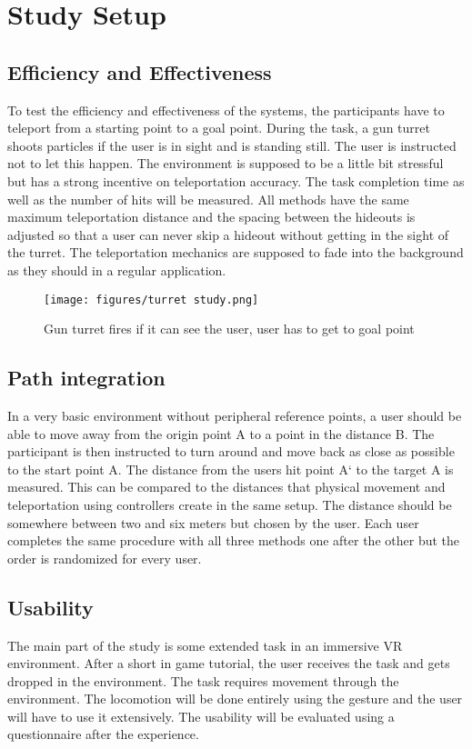 \section{Study Setup}



\subsection{Efficiency and Effectiveness}
To test the efficiency and effectiveness of the systems, the participants have to teleport from a starting point to a goal point. During the task, a gun turret shoots particles if the user is in sight and is standing still. The user is instructed not to let this happen. The environment is supposed to be a little bit stressful but has a strong incentive on teleportation accuracy. The task completion time as well as the number of hits will be measured. All methods have the same maximum teleportation distance and the spacing between the hideouts is adjusted so that a user can never skip a hideout without getting in the sight of the turret. The teleportation mechanics are supposed to fade into the background as they should in a regular application.

\begin{figure}[htb]
    \centering
    \texttt{[image: figures/turret study.png]}
    \caption{Gun turret fires if it can see the user, user has to get to goal point}
    \label{fig:turret}
  \end{figure}


\subsection{Path integration}
In a very basic environment without peripheral reference points, a user should be able to move away from the origin point A to a point in the distance B. The participant is then instructed to turn around and move back as close as possible to the start point A. The distance from the users hit point A` to the target A is measured. This can be compared to the distances that physical movement and teleportation using controllers create in the same setup. The distance should be somewhere between two and six meters but chosen by the user. Each user completes the same procedure with all three methods one after the other but the order is randomized for every user.


\subsection{Usability}
The main part of the study is some extended task in an immersive VR environment. After a short in game tutorial, the user receives the task and gets dropped in the environment. The task requires movement through the environment. The locomotion will be done entirely using the gesture and the user will have to use it extensively. The usability will be evaluated using a questionnaire after the experience.


